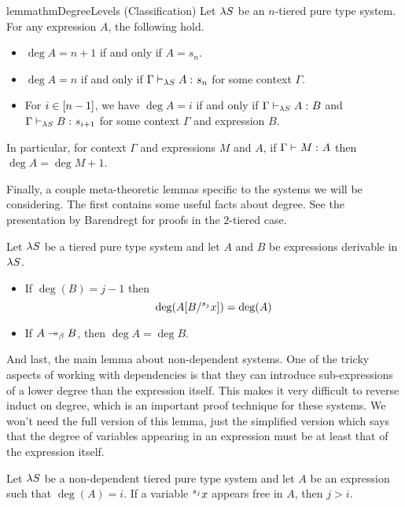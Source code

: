 \documentclass{article}
\begin{document}
\begin{restatable}{lemma}{thmDegreeLevels}
\label{lem:classification}
(Classification)
Let $\lS$ be an $n$-tiered pure type system.
For any expression $A$, the following hold.
\begin{itemize}
    \item $\deg A = n + 1$ if and only if $A = s_n$.
    \item $\deg A = n$ if and only if $\judgment[\lS] \Gamma A {s_n}$ for some context $\Gamma$.
    \item For $i \in \upto {n - 1}$, we have $\deg A = i$ if and only if $\judgment[\lS] \Gamma A B$ and $\judgment[\lS] \Gamma B {s_{i + 1}}$ for some context $\Gamma$ and expression $B$.
\end{itemize}
In particular, for context $\Gamma$ and expressions $M$ and $A$, if $\judgment \Gamma M A$ then $\deg A = \deg M + 1$.
\end{restatable}

Finally, a couple meta-theoretic lemmas specific to the systems we will be considering.
The first contains some useful facts about degree.
See the presentation by Barendregt \cite{barendregt-1993} for proofs in the $2$-tiered case.

\begin{lemma}
\label{lem:deg-facts}
Let $\lS$ be a tiered pure type system and let $A$ and $B$ be expressions derivable in $\lS$.
\begin{itemize}
\item If $\deg(B) = j - 1$ then
\[
\deg(\sub A B {\svar j x}) = \deg(A)
\]
\item If $A \multistepbeta B$, then $\deg A = \deg B$.
\end{itemize}
\end{lemma}

And last, the main lemma about non-dependent systems.
One of the tricky aspects of working with dependencies is that they can introduce sub-expressions of a lower degree than the expression itself.
This makes it very difficult to reverse induct on degree, which is an important proof technique for these systems.
We won't need the full version of this lemma, just the simplified version which says that the degree of variables appearing in an expression must be at least that of the expression itself.

\begin{lemma}
\label{lem:free-var-non-dep}
Let $\lS$ be a non-dependent tiered pure type system and let $A$ be an expression such that $\deg(A) = i$.
If a variable $\svar j x$ appears free in $A$, then $j > i$.
\end{lemma}
\end{document}

